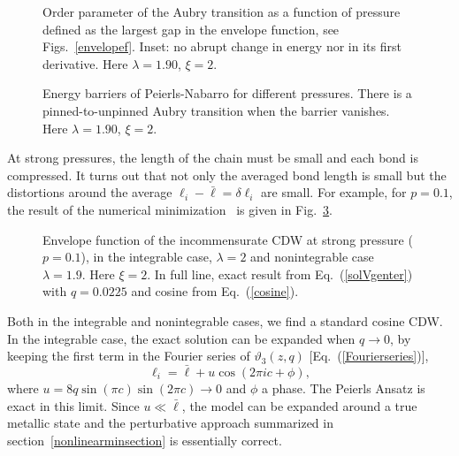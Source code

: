 \documentclass[]{revtex4-1}
\begin{document}
\begin{figure}[!h] \begin{center}
            \end{center}     \caption{Order parameter of the Aubry transition as a function of pressure defined as the largest gap in the envelope function, see Figs.~\ref{envelopef}. Inset: no abrupt change in energy nor in its first derivative. Here $\lambda=1.90$, $\xi=2$.}
  \label{orderparameterfig}
\end{figure}
\begin{figure}[!h] \begin{center}
   \end{center}
  \caption{Energy barriers of Peierls-Nabarro for different pressures. There is a pinned-to-unpinned Aubry transition when the barrier vanishes.  Here $\lambda=1.90$, $\xi=2$.}
  \label{barrierPeierlsN}
\end{figure}

At strong pressures, the length of the chain must be small and each bond is compressed. It turns out that not only the averaged bond length is small but the distortions around the average $\ell_i-\bar{\ell}=\delta \ell_i$ are small.
For example, for $p=0.1$, the result of the numerical minimization~\cite{carefull}  is given in Fig.~\ref{strongpressure}. 
\begin{figure}[!h]
  \begin{center}
\end{center} \caption{Envelope function of the incommensurate CDW at strong pressure ($p=0.1$), in the integrable case, $\lambda=2$ and nonintegrable case $\lambda=1.9$. Here $\xi=2$. In full line, exact result from Eq.~(\ref{solVgenter}) with $q=0.0225$ and cosine from Eq.~(\ref{cosine}).}     
  \label{strongpressure}
\end{figure}
Both in the integrable and nonintegrable cases, we find a standard cosine CDW.  In the integrable case, the exact solution can be expanded when $q \rightarrow 0$, by keeping the first term in the Fourier series of $\vartheta_3(z,q)$ [Eq.~(\ref{Fourierseries})],
\begin{equation}
\ell_i=\bar{\ell} + u \cos (2\pi ic+\phi), \label{cosine}
  \end{equation}
where $u =8q \sin (\pi c)\sin (2\pi c) \rightarrow 0$ and $\phi$ a phase. The Peierls Ansatz is exact in this limit. Since $u  \ll \bar{\ell}$, the model can be expanded around a true metallic state and the perturbative approach summarized in section~\ref{nonlinearminsection} is essentially correct.
\end{document}
